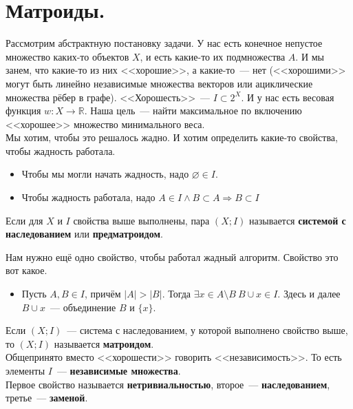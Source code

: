 \documentclass{article}
\begin{document}
    \section{Матроиды.}
    \begin{remark}
        Рассмотрим абстрактную постановку задачи. У нас есть конечное непустое множество каких-то объектов $X$, и есть какие-то их подмножества $A$. И мы занем, что какие-то из них <<хорошие>>, а какие-то~--- нет (<<хорошими>> могут быть линейно независимые множества векторов или ациклические множества рёбер в графе). <<Хорошесть>>~--- $I\subset 2^X$. И у нас есть весовая функция $w\colon X\to\mathbb R$. Наша цель~--- найти максимальное по включению <<хорошее>> множество минимального веса.\\
        Мы хотим, чтобы это решалось жадно. И хотим определить какие-то свойства, чтобы жадность работала.
        \begin{itemize}
            \item Чтобы мы могли начать жадность, надо $\varnothing\in I$.
            \item Чтобы жадность работала, надо $A\in I\land B\subset A\Rightarrow B\subset I$
        \end{itemize}
    \end{remark}
    \begin{definition}
        Если для $X$ и $I$ свойства выше выполнены, пара $(X;I)$ называется \textbf{системой с наследованием} или \textbf{предматроидом}.
    \end{definition}
    \begin{remark}
        Нам нужно ещё одно свойство, чтобы работал жадный алгоритм. Свойство это вот какое.
        \begin{itemize}
            \item Пусть $A,B\in I$, причём $|A|>|B|$. Тогда $\exists x\in A\setminus B~B\cup x\in I$. Здесь и далее $B\cup x$~--- объединение $B$ и $\{x\}$.
        \end{itemize}
    \end{remark}
    \begin{definition}
        Если $(X;I)$~--- система с наследованием, у которой выполнено свойство выше, то $(X;I)$ называется \textbf{матроидом}.\\
        Общепринято вместо <<хорошести>> говорить <<независимость>>. То есть элементы $I$~--- \textbf{независимые множества}.\\
        Первое свойство называется \textbf{нетривиальностью}, второе~--- \textbf{наследованием}, третье~--- \textbf{заменой}.
    \end{definition}
\end{document}
